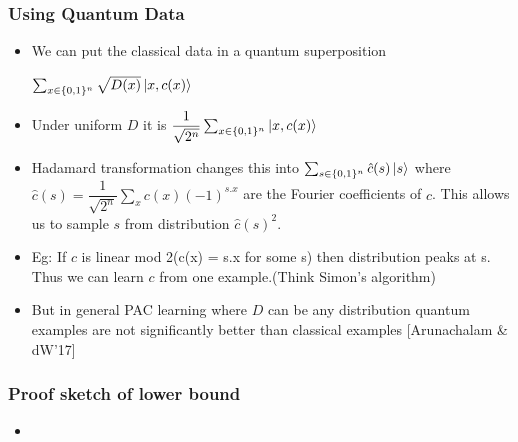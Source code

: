 \documentclass{beamer}
\begin{document}
\begin{frame}\frametitle{Using Quantum Data}
\begin{itemize}
    \item We can put the classical data in a quantum 
    superposition 

    $  \sum_{x \in \{0,1\}^{n} } \sqrt{D(x)} \ket{x, c(x)} $

    \item Under uniform $D$ it is $ \dfrac{1}{\sqrt{2^{n}}} \sum_{x \in \{0,1\}^{n} }  \ket{x, c(x)} $

    \item Hadamard transformation changes this into $  \sum_{s \in \{0,1\}^{n} } \hat{c}(s) \ket{s} $
    where $\hat{c}(s) = \dfrac{1}{\sqrt{2^{n}}} \sum_{x} c(x) (-1)^{s.x}$ are the Fourier coefficients of
    $c$. This allows us to sample $s$  from distribution $\hat{c}(s)^{2}$.

    \item Eg: If $c$ is linear mod 2(c(x) = s.x for some s)
    then distribution peaks at s. Thus we can learn $c$ from one example.(Think Simon's algorithm)
    \item But in general PAC learning where $D$ can be any distribution
    quantum examples are not significantly better than classical examples [Arunachalam \& dW’17]
    
\end{itemize}

\end{frame}


\begin{frame}\frametitle{Proof sketch of lower bound}
\begin{itemize}
    \item %
\end{itemize}
\end{frame}

\end{document}

